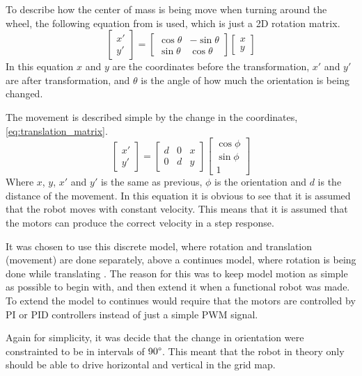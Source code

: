 \documentclass[Main]{subfiles}
\begin{document}
To describe how the center of mass is being move when turning around the wheel, the following equation from \citep{Wikipedia2015} is used, which is just a 2D rotation matrix.
\begin{equation}
\begin{bmatrix} x' \\ y' \end{bmatrix} = \begin{bmatrix} \cos{\theta} & -\sin{\theta} \\ \sin{\theta} & \cos{\theta} \end{bmatrix} \begin{bmatrix} x \\ y \end{bmatrix}
\end{equation}
In this equation $x$ and $y$ are the coordinates before the transformation, $x'$ and $y'$ are after transformation, and $\theta$ is the angle of how much the orientation is being changed.

The movement is described simple by the change in the coordinates, \autoref{eq:translation_matrix}.
\begin{equation}
\label{eq:translation_matrix}
\begin{bmatrix} x' \\ y' \end{bmatrix} = \begin{bmatrix}  d & 0 & x \\ 0 & d & y \end{bmatrix} \begin{bmatrix} \cos{\phi} \\ \sin{\phi} \\ 1 \end{bmatrix} 		
\end{equation}
Where $x$, $y$, $x'$ and $y'$ is the same as previous, $\phi$ is the orientation and $d$ is the distance of the movement.
In this equation it is obvious to see that it is assumed that the robot moves with constant velocity.
This means that it is assumed that the motors can produce the correct velocity in a step response.

It was chosen to use this discrete model, where rotation and translation (movement) are done separately, above a continues model, where rotation is being done while translating .
The reason for this was to keep model motion as simple as possible to begin with, and then extend it when a functional robot was made.
To extend the model to continues would require that the motors are controlled by PI or PID controllers instead of just a simple PWM signal.

Again for simplicity, it was decide that the change in orientation were constrainted to be in intervals of $90\degree$.
This meant that the robot in theory only should be able to drive horizontal and vertical in the grid map. 


\end{document}
